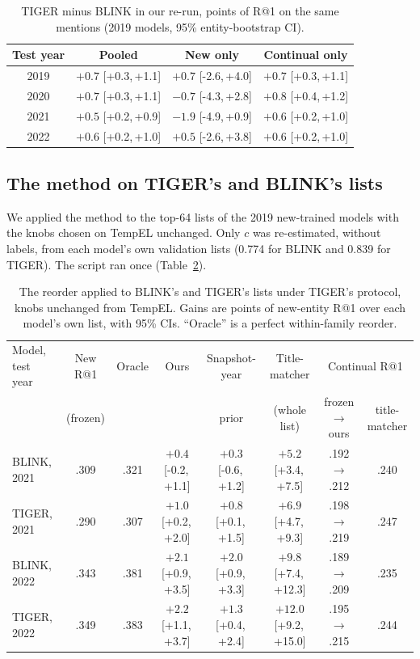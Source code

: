 \documentclass[conference]{IEEEtran}
\newcommand{\ci}[2]{[#1,\,#2]}
\begin{document}
\begin{table}[t]
\caption{TIGER minus BLINK in our re-run, points of R@1 on the same mentions (2019 models, 95\% entity-bootstrap CI).}
\label{tab:tb}
\centering
\footnotesize
\begin{tabular}{cccc}
\toprule
Test year & Pooled & New only & Continual only \\
\midrule
2019 & $+0.7$ \ci{+0.3}{+1.1} & $+0.7$ \ci{-2.6}{+4.0} & $+0.7$ \ci{+0.3}{+1.1} \\
2020 & $+0.7$ \ci{+0.3}{+1.1} & $-0.7$ \ci{-4.3}{+2.8} & $+0.8$ \ci{+0.4}{+1.2} \\
2021 & $+0.5$ \ci{+0.2}{+0.9} & $-1.9$ \ci{-4.9}{+0.9} & $+0.6$ \ci{+0.2}{+1.0} \\
2022 & $+0.6$ \ci{+0.2}{+1.0} & $+0.5$ \ci{-2.6}{+3.8} & $+0.6$ \ci{+0.2}{+1.0} \\
\bottomrule
\end{tabular}
\end{table}

\subsection{The method on TIGER's and BLINK's lists}

We applied the method to the top-64 lists of the 2019 new-trained models with the knobs chosen on
TempEL unchanged. Only $c$ was re-estimated, without labels, from each model's own validation lists
(0.774 for BLINK and 0.839 for TIGER). The script ran once (Table~\ref{tab:tigerb}).

\begin{table}[t]
\caption{The reorder applied to BLINK's and TIGER's lists under TIGER's protocol, knobs unchanged from TempEL. Gains are points of new-entity R@1 over each model's own list, with 95\% CIs. ``Oracle'' is a perfect within-family reorder.}
\label{tab:tigerb}
\centering
\footnotesize
\begin{tabular}{lccccccc}
\toprule
Model, test year & New R@1 & Oracle & Ours & Snapshot-year & Title-matcher & \multicolumn{2}{c}{Continual R@1} \\
 & (frozen) & & & prior & (whole list) & frozen $\rightarrow$ ours & title-matcher \\
\midrule
BLINK, 2021 & .309 & .321 & $+0.4$ \ci{-0.2}{+1.1} & $+0.3$ \ci{-0.6}{+1.2} & $+5.2$ \ci{+3.4}{+7.5} & .192 $\rightarrow$ .212 & .240 \\
TIGER, 2021 & .290 & .307 & $+1.0$ \ci{+0.2}{+2.0} & $+0.8$ \ci{+0.1}{+1.5} & $+6.9$ \ci{+4.7}{+9.3} & .198 $\rightarrow$ .219 & .247 \\
BLINK, 2022 & .343 & .381 & $+2.1$ \ci{+0.9}{+3.5} & $+2.0$ \ci{+0.9}{+3.3} & $+9.8$ \ci{+7.4}{+12.3} & .189 $\rightarrow$ .209 & .235 \\
TIGER, 2022 & .349 & .383 & $+2.2$ \ci{+1.1}{+3.7} & $+1.3$ \ci{+0.4}{+2.4} & $+12.0$ \ci{+9.2}{+15.0} & .195 $\rightarrow$ .215 & .244 \\
\bottomrule
\end{tabular}
\end{table}
\end{document}

